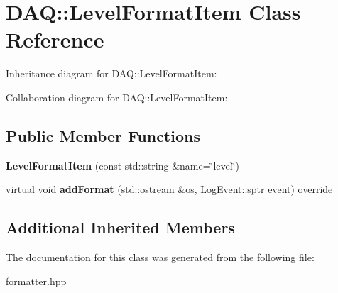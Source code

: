 \hypertarget{classDAQ_1_1LevelFormatItem}{}\section{D\+AQ\+:\+:Level\+Format\+Item Class Reference}
\label{classDAQ_1_1LevelFormatItem}


Inheritance diagram for D\+AQ\+:\+:Level\+Format\+Item\+:


Collaboration diagram for D\+AQ\+:\+:Level\+Format\+Item\+:
\subsection*{Public Member Functions}
\begin{DoxyCompactItemize}
\item 
\mbox{\label{classDAQ_1_1LevelFormatItem_aa848c642213f05f49cde63bd44f2358d}} 
{\bfseries Level\+Format\+Item} (const std\+::string \&name=\char`\"{}level\char`\"{})
\item 
\mbox{\label{classDAQ_1_1LevelFormatItem_aba08657d55fe9fc5c08a93909edecd73}} 
virtual void {\bfseries add\+Format} (std\+::ostream \&os, Log\+Event\+::sptr event) override
\end{DoxyCompactItemize}
\subsection*{Additional Inherited Members}


The documentation for this class was generated from the following file\+:\begin{DoxyCompactItemize}
\item 
formatter.\+hpp\end{DoxyCompactItemize}
